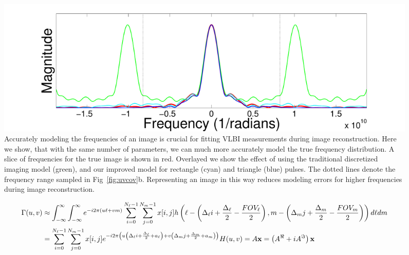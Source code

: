 \begin{figure}[b]
	\includegraphics[width=0.95\linewidth]{freqfig_9pulses_wrect_zoom_ex2_2.pdf}
	\caption{\footnotesize{Accurately modeling the frequencies of an image is crucial for fitting VLBI measurements during image reconstruction. Here we show, that with the same number of parameters, we can much more accurately model the true frequency distribution. A slice of frequencies for the true image is shown in red. Overlayed we show the effect of using the traditional discretized imaging model (green), and our improved model for rectangle (cyan) and triangle (blue) pulses. The dotted lines denote the frequency range sampled in Fig~\ref{fig:uvcov}b. Representing an image in this way reduces modeling errors for higher frequencies during image reconstruction.}}
	\label{fig:pulses}
\end{figure}

\begin{figure}[!t]
	\vspace{-.2in}
	\normalsize
	\setcounter{equation}{5}
	{\small
		\begin{align}
		\notag \Gamma(u,v) &\approx \int_{- \infty}^{\infty}\int_{- \infty}^{\infty} {e^{-i 2 \pi  (u\ell + vm) }} \sum_{i=0}^{N_\ell-1}\sum_{j=0}^{N_m-1} x[i,j] 
		h \left(\ell- \left( \Delta_{\ell}i + \frac{\Delta_{\ell}}{2}  -\frac{FOV_\ell}{2} \right),m- \left( \Delta_mj + \frac{\Delta_m}{2} -\frac{FOV_m}{2} \right) \right)  d\ell dm  
		\\ &=  \sum_{i=0}^{N_\ell-1}{\sum_{j=0}^{N_m-1}  x[i,j] e^{-i 2 \pi \left(u  \left( \Delta_{\ell}i + \frac{\Delta_{\ell}}{2} + a_\ell \right) + v \left( \Delta_mj + \frac{\Delta_m}{2} + a_m \right)  \right)} H(u, v)} = A {\bf x} = \left( A^{\Re} + i A^{\Im} \right) {\bf x}
		\label{eq:formodel}
		\end{align} 
	}
	\vspace{-.25in}
	\hrulefill
\end{figure}



